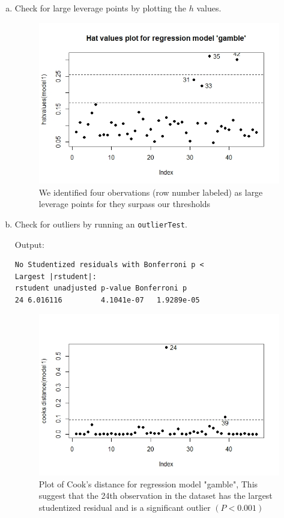 \documentclass[12pt,letterpaper]{article}
\begin{document}
\begin{enumerate}[(a)]
	\item Check for large leverage points by plotting the $h$ values.
	
		
	\begin{figure}[h!]\centering
	\label{hat}
	\includegraphics[width=.75\textwidth]{Hatvalue.JPEG}
	\caption{We identified four obervations (row number labeled) as large leverage points for they surpass our thresholds}
	\end{figure}
	
	\item Check for outliers by running an \texttt{outlierTest}. \vspace{.5cm}
	\vspace{.5cm}
	
	\newpage
	Output:
	\begin{Verbatim}
No Studentized residuals with Bonferroni p <
Largest |rstudent|:
rstudent unadjusted p-value Bonferroni p
24 6.016116         4.1041e-07   1.9289e-05
	\end{Verbatim}
	
	\begin{figure}[h!]\centering
	\label{Cook}
	\includegraphics[width=.75\textwidth]{Outlier.JPEG}
	\caption{Plot of Cook's distance for regression model "gamble",     This suggest that the 24th observation in the dataset has the largest studentized residual and is a significant outlier $(P < 0.001)$}
	\end{figure}
	

\end{enumerate}
\end{document}
